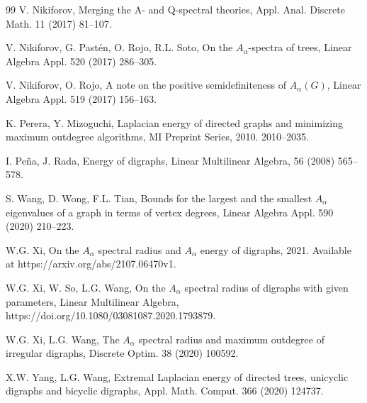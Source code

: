 \documentclass[11pt]{article}
\begin{document}
\begin{thebibliography}{99}
 V. Nikiforov, Merging the A- and Q-spectral theories, Appl. Anal. Discrete Math. 11 (2017) 81--107.

 V. Nikiforov, G. Past\'{e}n, O. Rojo, R.L. Soto, On the $A_\alpha$-spectra of trees, Linear Algebra Appl. 520 (2017) 286--305.

 V. Nikiforov, O. Rojo, A note on the positive semidefiniteness of $A_\alpha(G)$, Linear Algebra Appl. 519 (2017) 156--163.

 K. Perera, Y. Mizoguchi, Laplacian energy of directed graphs and minimizing maximum outdegree algorithms, MI Preprint Series, 2010. 2010--2035.

 I. Pe{\~{n}}a, J. Rada, Energy of digraphs, Linear Multilinear Algebra, 56 (2008) 565--578.

 S. Wang, D. Wong, F.L. Tian, Bounds for the largest and the smallest $A_\alpha$ eigenvalues of a graph in terms of vertex degrees, Linear Algebra Appl. 590 (2020) 210--223.

 W.G. Xi, On the $A_\alpha$ spectral radius and $A_\alpha$ energy of digraphs, 2021. Available at https://arxiv.org/abs/2107.06470v1.

 W.G. Xi, W. So, L.G. Wang, On the $A_\alpha$ spectral radius of digraphs with given parameters, Linear Multilinear Algebra, https://doi.org/10.1080/03081087.2020.1793879.

 W.G. Xi, L.G. Wang, The $A_\alpha$ spectral radius and maximum outdegree of irregular digraphs, Discrete Optim. 38 (2020) 100592.

 X.W. Yang, L.G. Wang, Extremal Laplacian energy of directed trees, unicyclic digraphs and bicyclic digraphs, Appl. Math. Comput. 366 (2020) 124737.


\end{thebibliography}
\end{document}
